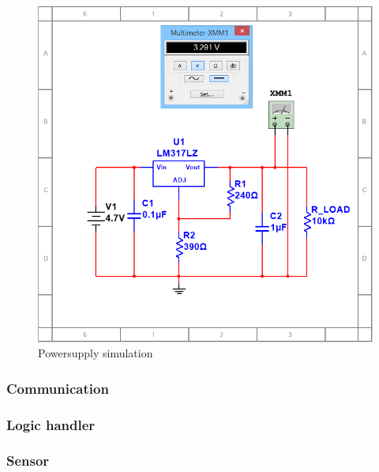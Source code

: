 \begin{figure}[H]
	\centering
	\includegraphics[width=.5\textwidth]{billeder/PS_lm317_sim}
	\caption{Powersupply simulation}
	\label{fig:ps_sim}
\end{figure}



\subsubsection{Communication}

\subsubsection{Logic handler}

\subsubsection{Sensor}








